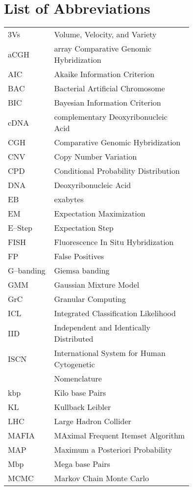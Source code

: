 \chapter*{List of Abbreviations}

\begin{longtable}[l]{lp{0.75\linewidth}}

3Vs	& Volume, Velocity, and Variety\\
aCGH	& array Comparative Genomic Hybridization\\
AIC	& Akaike Information Criterion \\
BAC	& Bacterial Artificial Chromosome \\
BIC	& Bayesian Information Criterion \\
cDNA	& complementary Deoxyribonucleic Acid \\
CGH	& Comparative Genomic Hybridization \\
CNV	& Copy Number Variation \\
CPD	& Conditional Probability Distribution\\
DNA	& Deoxyribonucleic Acid  \\
EB	& exabytes \\
EM	& Expectation Maximization \\
E--Step	& Expectation Step \\
FISH	& Fluorescence In Situ Hybridization\\
FP	& False Positives \\
G--banding & Giemsa banding \\
GMM	& Gaussian Mixture Model \\
GrC	& Granular Computing \\
ICL	& Integrated Classification Likelihood \\
IID	& Independent and Identically Distributed \\
ISCN	& International System for Human Cytogenetic \\
	& \hspace{5mm}Nomenclature \\
kbp	& Kilo base Pairs \\
KL	& Kullback Leibler \\
LHC	& Large Hadron Collider  \\
MAFIA	& MAximal Frequent Itemset Algorithm \\
MAP	& Maximum a Posteriori Probability \\
Mbp	& Mega base Pairs \\
MCMC	& Markov Chain Monte Carlo \\

\end{longtable}
